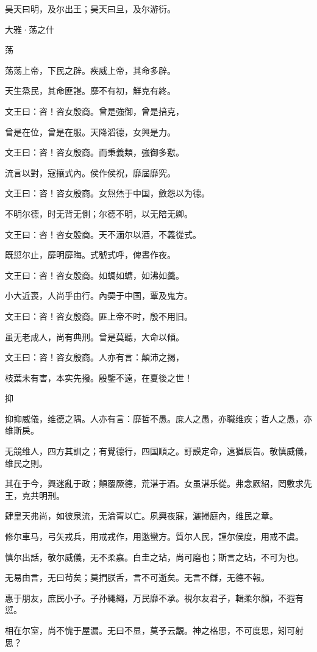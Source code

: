 昊天曰明，及尔出王；昊天曰旦，及尔游衍。




大雅·荡之什


荡

荡荡上帝，下民之辟。疾威上帝，其命多辟。

天生烝民，其命匪諶。靡不有初，鮮克有終。

文王曰：咨！咨女殷商。曾是強御，曾是掊克，

曾是在位，曾是在服。天降滔德，女興是力。

文王曰：咨！咨女殷商。而秉義類，強御多懟。

流言以對，寇攘式內。侯作侯祝，靡屆靡究。

文王曰：咨！咨女殷商。女炰烋于中国，斂怨以为德。

不明尔德，时无背无側；尔德不明，以无陪无卿。

文王曰：咨！咨女殷商。天不湎尔以酒，不義從式。

既愆尔止，靡明靡晦。式號式呼，俾晝作夜。

文王曰：咨！咨女殷商。如蜩如螗，如沸如羹。

小大近喪，人尚乎由行。內奰于中国，覃及鬼方。

文王曰：咨！咨女殷商。匪上帝不时，殷不用旧。

虽无老成人，尚有典刑。曾是莫聽，大命以傾。

文王曰：咨！咨女殷商。人亦有言：顛沛之揭，

枝葉未有害，本实先撥。殷鑒不遠，在夏後之世！

抑

抑抑威儀，维德之隅。人亦有言：靡哲不愚。庶人之愚，亦職维疾；哲人之愚，亦维斯戾。

无競维人，四方其訓之；有覺德行，四国順之。訏謨定命，遠猶辰告。敬慎威儀，维民之則。

其在于今，興迷亂于政；顛覆厥德，荒湛于酒。女虽湛乐從。弗念厥紹，罔敷求先王，克共明刑。

肆皇天弗尚，如彼泉流，无淪胥以亡。夙興夜寐，灑掃庭內，维民之章。

修尔車马，弓矢戎兵，用戒戎作，用逖蠻方。質尔人民，謹尔侯度，用戒不虞。

慎尔出話，敬尔威儀，无不柔嘉。白圭之玷，尚可磨也；斯言之玷，不可为也。

无易由言，无曰茍矣；莫捫朕舌，言不可逝矣。无言不讎，无德不報。

惠于朋友，庶民小子。子孙繩繩，万民靡不承。視尔友君子，輯柔尔顏，不遐有愆。

相在尔室，尚不愧于屋漏。无曰不显，莫予云覯。神之格思，不可度思，矧可射思？

